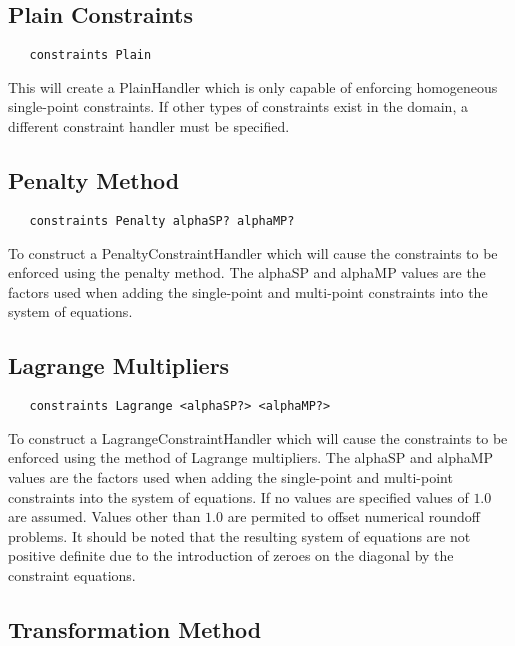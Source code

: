 \documentclass[12pt]{article}
\begin{document}
\subsection{Plain Constraints}

{\sf\small
\begin{verbatim}
   constraints Plain
\end{verbatim}
}

\noindent This will create a PlainHandler which is only capable of enforcing
homogeneous single-point constraints. If other types of constraints
exist in the domain, a different constraint handler must be specified.

\subsection{Penalty Method}

{\sf\small
\begin{verbatim}
   constraints Penalty alphaSP? alphaMP?
\end{verbatim}
}

\noindent To construct a PenaltyConstraintHandler which will cause the
constraints to be enforced using the penalty method. The alphaSP and
alphaMP values are the factors used when adding the single-point and
multi-point constraints into the system of equations.

\subsection{Lagrange Multipliers}

{\sf\small
\begin{verbatim}
   constraints Lagrange <alphaSP?> <alphaMP?>
\end{verbatim}
}

\noindent To construct a LagrangeConstraintHandler which will cause the
constraints to be enforced using the method of Lagrange multipliers. The alphaSP and
alphaMP values are the factors used when adding the single-point and
multi-point constraints into the system of equations. If no values are specified
values of $1.0$ are assumed. Values other than $1.0$ are permited to offset numerical
roundoff problems. It should be
noted that the resulting system of equations are not positive definite
due to the introduction of zeroes on the diagonal by the constraint equations.

\subsection{Transformation Method}
\end{document}
